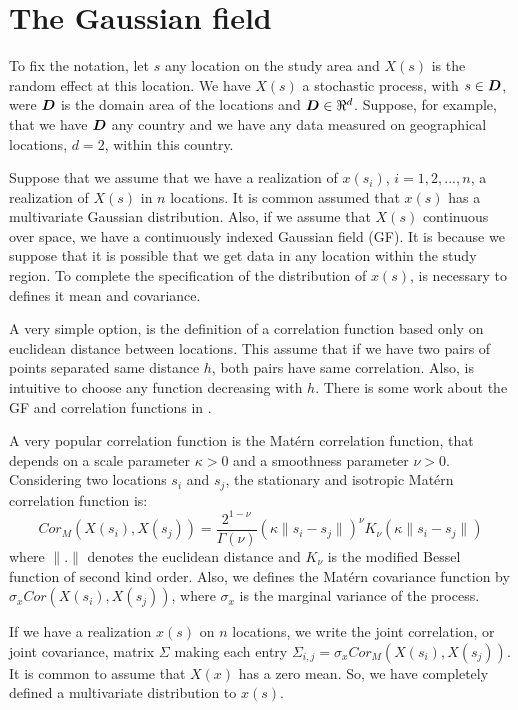 \section{The Gaussian field}

To fix the notation, let $s$ any location on the study 
area and $X(s)$ is the random effect at this location. 
We have $X(s)$ a stochastic process, with $s\in \mbox{\protect \boldmath $D$}$, 
were $\mbox{\protect \boldmath $D$}$ is the domain area of the locations 
and $\mbox{\protect \boldmath $D$}\in \Re^d$. 
Suppose, for example, that we have $\mbox{\protect \boldmath $D$}$ any country 
and we have any data measured on geographical 
locations, $d=2$, within this country. 

Suppose that we assume that we have a realization 
of $x(s_i)$, $i=1,2,...,n$, a realization of $X(s)$ 
in $n$ locations. It is common assumed that 
$x(s)$ has a multivariate Gaussian distribution. 
Also, if we assume that $X(s)$ continuous over space, 
we have a continuously indexed Gaussian field (GF). 
It is because we suppose that it is possible that 
we get data in any location within the study region. 
To complete the specification of the distribution of 
$x(s)$, is necessary to defines it mean and covariance. 

A very simple option, is the definition of a 
correlation function based only on euclidean 
distance between locations. 
This assume that if we have two pairs of 
points separated same distance $h$, both pairs 
have same correlation. 
Also, is intuitive to choose any function 
decreasing with $h$. 
There is some work about the GF and correlation 
functions in \cite{abrahamsen:1997}. 

A very popular correlation function is the 
Mat\'ern correlation function, that depends 
on a scale parameter $\kappa>0$ and a smoothness 
parameter $\nu>0$. 
Considering two locations $s_i$ and $s_j$, the 
stationary and isotropic Mat\'ern correlation function is: 
\begin{equation}
Cor_M(X(s_i), X(s_j)) = 
\frac{2^{1-\nu}}{\Gamma(\nu)}
(\kappa \parallel s_i - s_j\parallel)^\nu 
K_\nu(\kappa \parallel s_i - s_j \parallel)
\end{equation}
where $\parallel . \parallel$ denotes 
the euclidean distance and $K_\nu$ is the modified 
Bessel function of second kind order. 
Also, we defines the Mat\'ern covariance function 
by $\sigma_x Cor(X(s_i), X(s_j))$, where 
$\sigma_x$ is the marginal variance of the process. 

If we have a realization $x(s)$ on $n$ locations, 
we write the joint correlation, or joint covariance, 
matrix $\Sigma$ making each entry 
$\Sigma_{i,j} = \sigma_xCor_M(X(s_i), X(s_j))$. 
It is common to assume that $X(x)$ has a zero mean. 
So, we have completely defined a multivariate 
distribution to $x(s)$. 

